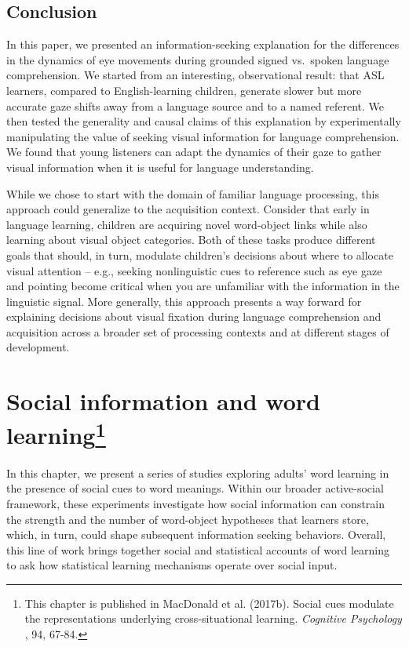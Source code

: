\documentclass[oneside]{report}
\begin{document}
\section{Conclusion}\label{conclusion-1}

In this paper, we presented an information-seeking explanation for the
differences in the dynamics of eye movements during grounded signed
vs.~spoken language comprehension. We started from an interesting,
observational result: that ASL learners, compared to English-learning
children, generate slower but more accurate gaze shifts away from a
language source and to a named referent. We then tested the generality
and causal claims of this explanation by experimentally manipulating the
value of seeking visual information for language comprehension. We found
that young listeners can adapt the dynamics of their gaze to gather
visual information when it is useful for language understanding.

While we chose to start with the domain of familiar language processing,
this approach could generalize to the acquisition context. Consider that
early in language learning, children are acquiring novel word-object
links while also learning about visual object categories. Both of these
tasks produce different goals that should, in turn, modulate children's
decisions about where to allocate visual attention -- e.g., seeking
nonlinguistic cues to reference such as eye gaze and pointing become
critical when you are unfamiliar with the information in the linguistic
signal. More generally, this approach presents a way forward for
explaining decisions about visual fixation during language comprehension
and acquisition across a broader set of processing contexts and at
different stages of development.

\chapter[Social information and word learning]{\texorpdfstring{Social
information and word learning\footnote{This chapter is published in
  MacDonald et al. (2017b). Social cues modulate the representations
  underlying cross-situational learning. \emph{Cognitive Psychology },
  94, 67-84.}}{Social information and word learning}}\label{social-information-and-word-learning}

In this chapter, we present a series of studies exploring adults' word
learning in the presence of social cues to word meanings. Within our
broader active-social framework, these experiments investigate how
social information can constrain the strength and the number of
word-object hypotheses that learners store, which, in turn, could shape
subsequent information seeking behaviors. Overall, this line of work
brings together social and statistical accounts of word learning to ask
how statistical learning mechanisms operate over social input.
\end{document}

